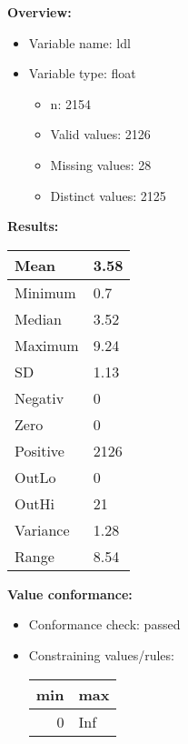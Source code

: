 \documentclass[
]{article}
\providecommand{\tightlist}{%
  \setlength{\itemsep}{0pt}\setlength{\parskip}{0pt}}
\begin{document}
\textbf{Overview:}

\begin{itemize}
\tightlist
\item
  Variable name: ldl
\item
  Variable type: float

  \begin{itemize}
  \tightlist
  \item
    n: 2154
  \item
    Valid values: 2126
  \item
    Missing values: 28
  \item
    Distinct values: 2125
  \end{itemize}
\end{itemize}

\textbf{Results:}\\

\begin{table}[H]
\centering
\begin{tabular}{l|l}
\hline
Mean & 3.58\\
\hline
Minimum & 0.7\\
\hline
Median & 3.52\\
\hline
Maximum & 9.24\\
\hline
SD & 1.13\\
\hline
Negativ & 0\\
\hline
Zero & 0\\
\hline
Positive & 2126\\
\hline
OutLo & 0\\
\hline
OutHi & 21\\
\hline
Variance & 1.28\\
\hline
Range & 8.54\\
\hline
\end{tabular}
\end{table}

\textbf{Value conformance:}

\begin{itemize}
\tightlist
\item
  Conformance check: passed
\item
  Constraining values/rules:

  \begin{table}[H]
  \centering
  \begin{tabular}{r|l}
  \hline
  \textbf{min} & \textbf{max}\\
  \hline
  0 & Inf\\
  \hline
  \end{tabular}
  \end{table}
\end{itemize}
\end{document}
